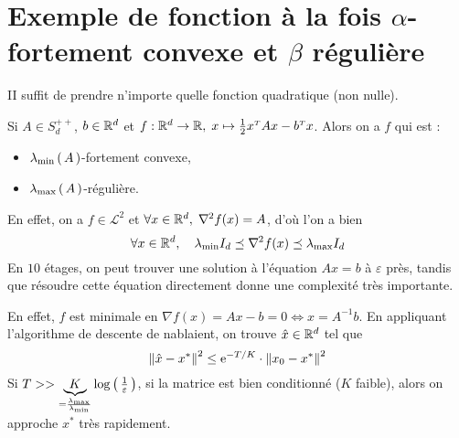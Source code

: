 \section{Exemple de fonction à la fois $\alpha$-fortement convexe et
 $\beta$ régulière}

 II suffit de prendre n'importe quelle fonction quadratique (non nulle).

 Si $A \in S_d^{++}$, $b \in \mathbb{R}^d$ et $f: \mathbb{R}^d \rightarrow \mathbb{R}, \; x \mapsto \frac{1}{2} x^{\scriptscriptstyle T}Ax-b^{\scriptscriptstyle T}x$.
 Alors on a $f$ qui est :
 \begin{itemize}
   \item $\lambda_{\min}\left( \, A \, \right)$-fortement convexe,
   \item $\lambda_{\max}\left( \, A \, \right)$-régulière.
 \end{itemize}

 En effet, on a $f \in \mathcal{L}^2$ et $ \forall x \in \mathbb{R}^d, \; \nabla\!^{\,2}f(x) = A$,
 d'où l'on a bien
 \begin{equation*}
   \forall x \in \mathbb{R}^d, \quad \lambda_{\min} I_d \preceq  \nabla\!^{\,2}f(x) \preceq
   \lambda_{\max} I_d
 \end{equation*}
 En $10$ étages, on peut trouver une solution à l'équation $Ax= b$ à $\varepsilon$
 près, tandis que résoudre cette équation directement donne une complexité très importante.

 En effet, $f$ est minimale en $\nabla\! f(x) = Ax-b = 0 \Leftrightarrow x=A^{-1}b$.
 En appliquant l'algorithme de descente de nabla\!ient, on trouve $\hat{x} \in \mathbb{R}^d$ tel que
 \begin{equation*}
\norme{\hat{x} - x^{*}}^2 \leq \e^{-T/K}\cdot \norme{x_0-x^{*}}^2
 \end{equation*}
 Si $T >> \underbrace{K}_{= \frac{\lambda_{\max}}{\lambda_{\min}}} \log \left( \, \frac{1}{\varepsilon} \, \right) $, \eg si la matrice est bien conditionné ($K$ faible),
  alors on approche $x^{*}$ très rapidement.

